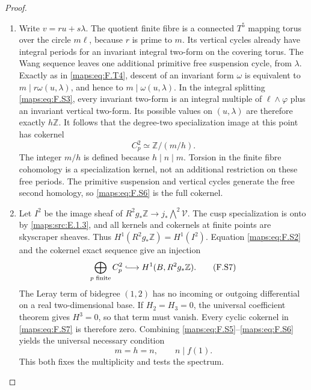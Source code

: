 \begin{proof}
\begin{enumerate}[label=\arabic*.]
\item Write $v=ru+s\lambda$.  The quotient finite fibre is a
connected $T^5$ mapping torus over the circle $m\ell$,
because $r$ is prime to $m$.
Its vertical cycles already have integral periods for an
invariant integral two-form on the covering torus.
The Wang sequence leaves one additional primitive free
suspension cycle, from $\lambda$.
Exactly as in \eqref{maps:eq:F.T4}, descent of an invariant form $\omega$
is equivalent to
$m\mid r\omega(u,\lambda)$, and hence to
$m\mid\omega(u,\lambda)$.
In the integral splitting \eqref{maps:eq:F.S3}, every invariant two-form
is an integral multiple of $\ell\wedge\varphi$ plus an
invariant vertical two-form.  Its possible values on
$(u,\lambda)$ are therefore exactly $h\mathbb Z$.
It follows that the degree-two specialization image at
this point has cokernel
\[
 C^2_p\simeq\mathbb Z/(m/h).
 \tag{F.S6}\label{maps:eq:F.S6}
\]
The integer $m/h$ is defined because $h\mid n\mid m$.
Torsion in the finite fibre cohomology is a specialization
kernel, not an additional restriction on these free periods.
The primitive suspension and vertical cycles generate the
free second homology, so \eqref{maps:eq:F.S6} is the full cokernel.

\item Let $I^2$ be the image sheaf of
$R^2g_*\mathbb Z\to j_*\bigwedge^2\mathcal V$.
The cusp specialization is onto by \ref{maps:src:E.1.3}, and all kernels
and cokernels at finite points are skyscraper sheaves.
Thus $H^1(R^2g_*\mathbb Z)=H^1(I^2)$.
Equation \eqref{maps:eq:F.S2} and the cokernel exact sequence give an
injection
\[
 \bigoplus_{p\text{ finite}}C^2_p
           \lhook\joinrel\longrightarrow H^1(B,R^2g_*\mathbb Z).
 \tag{F.S7}\label{maps:eq:F.S7}
\]
The Leray term of bidegree $(1,2)$ has no incoming or
outgoing differential on a real two-dimensional base.
If $H_2=H_3=0$, the universal coefficient theorem gives
$H^3=0$, so that term must vanish.
Every cyclic cokernel in \eqref{maps:eq:F.S7} is therefore zero.
Combining \eqref{maps:eq:F.S5}--\eqref{maps:eq:F.S6} yields the universal necessary
condition
\[
 m=h=n,\qquad n\mid f(1).
 \tag{F.S8}\label{maps:eq:F.S8}
\]
This both fixes the multiplicity and tests the spectrum.


\end{enumerate}
\end{proof}

